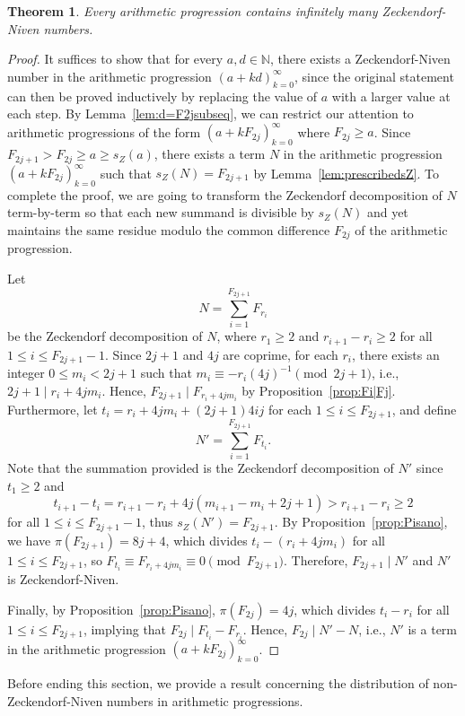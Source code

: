 \documentclass[12pt]{article}
\newtheorem{theorem}{Theorem}[section]
\theoremstyle{definition}
\newcommand{\N}{\mathbb{N}}
\begin{document}
\begin{theorem}\label{thm:infinZN}
Every arithmetic progression contains infinitely many Zeckendorf-Niven numbers.
\end{theorem}
\begin{proof}
It suffices to show that for every $a,d\in\N$, there exists a Zeckendorf-Niven number in the arithmetic progression $(a+kd)_{k=0}^\infty$, since the original statement can then be proved inductively by replacing the value of $a$ with a larger value at each step. By Lemma~\ref{lem:d=F2jsubseq}, we can restrict our attention to arithmetic progressions of the form $(a+kF_{2j})_{k=0}^\infty$ where $F_{2j}\geq a$. Since $F_{2j+1}>F_{2j}\geq a\geq s_Z(a)$, there exists a term $N$ in the arithmetic progression $(a+kF_{2j})_{k=0}^\infty$ such that $s_Z(N)=F_{2j+1}$ by Lemma~\ref{lem:prescribedsZ}. To complete the proof, we are going to transform the Zeckendorf decomposition of $N$ term-by-term so that each new summand is divisible by $s_Z(N)$ and yet maintains the same residue modulo the common difference $F_{2j}$ of the arithmetic progression.

Let
\[N=\sum_{i=1}^{F_{2j+1}}F_{r_i}\]
be the Zeckendorf decomposition of $N$, where $r_1\geq2$ and $r_{i+1}-r_i\geq2$ for all $1\leq i\leq F_{2j+1}-1$. Since $2j+1$ and $4j$ are coprime, for each $r_i$, there exists an integer $0\leq m_i<2j+1$ such that $m_i\equiv-r_i(4j)^{-1}\pmod{2j+1}$, i.e., $2j+1\mid r_i+4jm_i$. Hence, $F_{2j+1}\mid F_{r_i+4jm_i}$ by Proposition~\ref{prop:Fi|Fj}. Furthermore, let $t_i=r_i+4jm_i+(2j+1)4ij$ for each $1\leq i\leq F_{2j+1}$, and define
\[N'=\sum_{i=1}^{F_{2j+1}}F_{t_i}.\]
Note that the summation provided is the Zeckendorf decomposition of $N'$ since $t_1\geq2$ and
\[t_{i+1}-t_i=r_{i+1}-r_i+4j(m_{i+1}-m_i+2j+1)>r_{i+1}-r_i\geq2\]
for all $1\leq i\leq F_{2j+1}-1$, thus $s_Z(N')=F_{2j+1}$. By Proposition~\ref{prop:Pisano}, we have $\pi(F_{2j+1})=8j+4$, which divides $t_i-(r_i+4jm_i)$ for all $1\leq i\leq F_{2j+1}$, so $F_{t_i}\equiv F_{r_i+4jm_i}\equiv0\pmod{F_{2j+1}}$. Therefore, $F_{2j+1}\mid N'$ and $N'$ is Zeckendorf-Niven.

Finally, by Proposition~\ref{prop:Pisano}, $\pi(F_{2j})=4j$, which divides $t_i-r_i$ for all $1\leq i\leq F_{2j+1}$, implying that $F_{2j}\mid F_{t_i}-F_{r_i}$. Hence, $F_{2j}\mid N'-N$, i.e., $N'$ is a term in the arithmetic progression $(a+kF_{2j})_{k=0}^\infty$. 
\end{proof}

Before ending this section, we provide a result concerning the distribution of non-Zeckendorf-Niven numbers in arithmetic progressions.
\end{document}

